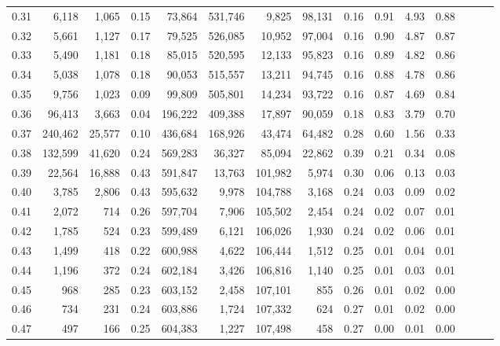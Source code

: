 \begin{tabular}{rrrrrrrrrrrrrrr}
0.31 &    6,118 &   1,065 &  0.15 &   73,864 &  531,746 &    9,825 &   98,131 &  0.16 &  0.91 &  4.93 &      0.88 \\
0.32 &    5,661 &   1,127 &  0.17 &   79,525 &  526,085 &   10,952 &   97,004 &  0.16 &  0.90 &  4.87 &      0.87 \\
0.33 &    5,490 &   1,181 &  0.18 &   85,015 &  520,595 &   12,133 &   95,823 &  0.16 &  0.89 &  4.82 &      0.86 \\
0.34 &    5,038 &   1,078 &  0.18 &   90,053 &  515,557 &   13,211 &   94,745 &  0.16 &  0.88 &  4.78 &      0.86 \\
0.35 &    9,756 &   1,023 &  0.09 &   99,809 &  505,801 &   14,234 &   93,722 &  0.16 &  0.87 &  4.69 &      0.84 \\
0.36 &   96,413 &   3,663 &  0.04 &  196,222 &  409,388 &   17,897 &   90,059 &  0.18 &  0.83 &  3.79 &      0.70 \\
0.37 &  240,462 &  25,577 &  0.10 &  436,684 &  168,926 &   43,474 &   64,482 &  0.28 &  0.60 &  1.56 &      0.33 \\
0.38 &  132,599 &  41,620 &  0.24 &  569,283 &   36,327 &   85,094 &   22,862 &  0.39 &  0.21 &  0.34 &      0.08 \\
0.39 &   22,564 &  16,888 &  0.43 &  591,847 &   13,763 &  101,982 &    5,974 &  0.30 &  0.06 &  0.13 &      0.03 \\
0.40 &    3,785 &   2,806 &  0.43 &  595,632 &    9,978 &  104,788 &    3,168 &  0.24 &  0.03 &  0.09 &      0.02 \\
0.41 &    2,072 &     714 &  0.26 &  597,704 &    7,906 &  105,502 &    2,454 &  0.24 &  0.02 &  0.07 &      0.01 \\
0.42 &    1,785 &     524 &  0.23 &  599,489 &    6,121 &  106,026 &    1,930 &  0.24 &  0.02 &  0.06 &      0.01 \\
0.43 &    1,499 &     418 &  0.22 &  600,988 &    4,622 &  106,444 &    1,512 &  0.25 &  0.01 &  0.04 &      0.01 \\
0.44 &    1,196 &     372 &  0.24 &  602,184 &    3,426 &  106,816 &    1,140 &  0.25 &  0.01 &  0.03 &      0.01 \\
0.45 &      968 &     285 &  0.23 &  603,152 &    2,458 &  107,101 &      855 &  0.26 &  0.01 &  0.02 &      0.00 \\
0.46 &      734 &     231 &  0.24 &  603,886 &    1,724 &  107,332 &      624 &  0.27 &  0.01 &  0.02 &      0.00 \\
0.47 &      497 &     166 &  0.25 &  604,383 &    1,227 &  107,498 &      458 &  0.27 &  0.00 &  0.01 &      0.00 \\

\end{tabular}

